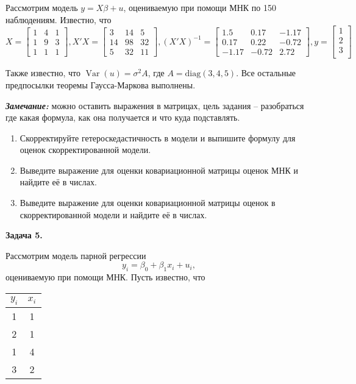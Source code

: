 \documentclass[10pt, a4paper]{extarticle}
\DeclareMathOperator{\Var}{Var}
\begin{document}
	Рассмотрим модель $y = X\beta + u$, оцениваемую при помощи МНК по 150 наблюдениям. Известно, что
	\[
	X = \begin{bmatrix}
	1 & 4 & 1 \\
	1 & 9 & 3 \\
	1 & 1 & 1
	\end{bmatrix},
	X'X = \begin{bmatrix}
		3 & 14 & 5 \\
		14 & 98 & 32 \\
		5 & 32 & 11
	\end{bmatrix},
	(X'X)^{-1} = \begin{bmatrix}
		1.5 & 0.17 & -1.17 \\
		0.17 & 0.22 & -0.72 \\
		-1.17 & -0.72 & 2.72
	\end{bmatrix},
	y = \begin{bmatrix}
		1 \\
		2 \\
		3 \\
	\end{bmatrix}
	\]
	
	Также известно, что $\Var(u) = \sigma^2A$, где $A = \mathrm{diag}(3, 4, 5)$. Все остальные предпосылки теоремы Гаусса-Маркова выполнены.
	
	\textit{\textbf{Замечание:}} можно оставить выражения в матрицах, цель задания -- разобраться где какая формула, как она получается и что куда подставлять.
	
	\begin{enumerate}[label = \alph*)]
		\item Скорректируйте гетероскедастичность в модели и выпишите формулу для оценок скорректированной модели.
		\item Выведите выражение для оценки ковариационной матрицы оценок МНК и найдите её в числах.
		\item Выведите выражение для оценки ковариационной матрицы оценок в скорректированной модели и найдите её в числах.
	\end{enumerate}
	\vspace{1em}

	{\Large \textbf{Задача 5.}}
	
	Рассмотрим модель парной регрессии
	\[
	y_i = \beta_0 + \beta_1x_i + u_i,
	\]
	оцениваемую при помощи МНК. Пусть известно, что 
	
	\begin{center}
	\begin{tabular}{c|c}
		$y_i$ & $x_i$ \\
		\hline
		1 & 1 \\
		2 & 1 \\
		1 & 4 \\
		3 & 2
	\end{tabular}
	\end{center}
\end{document}
